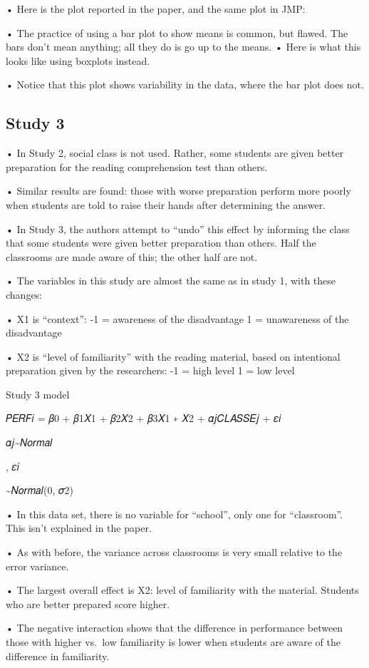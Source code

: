 \documentclass[
  letterpaper,
  DIV=11,
  numbers=noendperiod]{scrreprt}
\begin{document}
• Here is the plot reported in the paper, and the same plot in JMP:

• The practice of using a bar plot to show means is common, but flawed.
The bars don't mean anything; all they do is go up to the means. • Here
is what this looks like using boxplots instead.

• Notice that this plot shows variability in the data, where the bar
plot does not.

\hypertarget{study-3}{%
\subsection{Study 3}\label{study-3}}

• In Study 2, social class is not used. Rather, some students are given
better preparation for the reading comprehension test than others.

• Similar results are found: those with worse preparation perform more
poorly when students are told to raise their hands after determining the
answer.

• In Study 3, the authors attempt to ``undo'' this effect by informing
the class that some students were given better preparation than others.
Half the classrooms are made aware of this; the other half are not.

• The variables in this study are almost the same as in study 1, with
these changes:

• X1 is ``context'': -1 = awareness of the disadvantage 1 = unawareness
of the disadvantage

• X2 is ``level of familiarity'' with the reading material, based on
intentional preparation given by the researchers: -1 = high level 1 =
low level

Study 3 model

𝑃𝐸𝑅𝐹𝑖 = 𝛽0 + 𝛽1𝑋1 + 𝛽2𝑋2 + 𝛽3𝑋1 ∗ 𝑋2 + 𝛼𝑗𝐶𝐿𝐴𝑆𝑆𝐸𝑗 + 𝜀𝑖

𝛼𝑗\textasciitilde 𝑁𝑜𝑟𝑚𝑎𝑙

, 𝜀𝑖

\textasciitilde 𝑁𝑜𝑟𝑚𝑎𝑙(0, 𝜎2)

• In this data set, there is no variable for ``school'', only one for
``classroom''. This isn't explained in the paper.

• As with before, the variance across classrooms is very small relative
to the error variance.

• The largest overall effect is X2: level of familiarity with the
material. Students who are better prepared score higher.

• The negative interaction shows that the difference in performance
between those with higher vs.~low familiarity is lower when students are
aware of the difference in familiarity.
\end{document}
